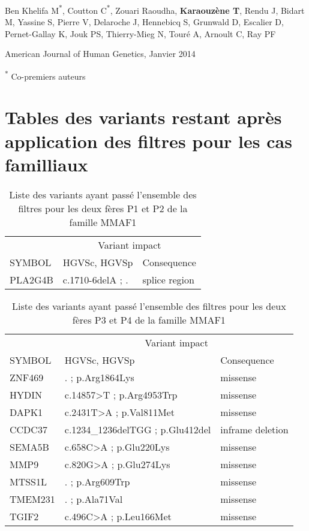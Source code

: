 \documentclass[12pt,twoside]{ugathesis}
\begin{document}
Ben Khelifa M\textsuperscript{*}, Coutton C\textsuperscript{*}, Zouari
Raoudha, \textbf{Karaouzène T}, Rendu J, Bidart M, Yassine S, Pierre V,
Delaroche J, Hennebicq S, Grunwald D, Escalier D, Pernet-Gallay K, Jouk
PS, Thierry-Mieg N, Touré A, Arnoult C, Ray PF

American Journal of Human Genetics, Janvier 2014

\textsuperscript{*} Co-premiers auteurs

\newpage



\newpage

\newpage

\chapter{Tables des variants restant après application des filtres pour
les cas
familliaux}\label{tables-des-variants-restant-apres-application-des-filtres-pour-les-cas-familliaux}

\begin{longtable}[t]{lll}
\caption{\label{tab:tabmmaf1}Liste des variants ayant passé l'ensemble des filtres pour les deux fères P1 et P2 de la famille MMAF1}\\
\toprule
\multicolumn{1}{c}{ } & \multicolumn{2}{c}{Variant impact} \\
\cmidrule(l{2pt}r{2pt}){2-3}
SYMBOL & HGVSc, HGVSp & Consequence\\
\midrule
PLA2G4B & c.1710-6delA ; . & splice region\\
\bottomrule
\end{longtable}

\begin{longtable}[t]{lll}
\caption{\label{tab:tabmmaf2}Liste des variants ayant passé l'ensemble des filtres pour les deux fères P3 et P4 de la famille MMAF1}\\
\toprule
\multicolumn{1}{c}{ } & \multicolumn{2}{c}{Variant impact} \\
\cmidrule(l{2pt}r{2pt}){2-3}
SYMBOL & HGVSc, HGVSp & Consequence\\
\midrule
ZNF469 & . ; p.Arg1864Lys & missense\\
HYDIN & c.14857>T ; p.Arg4953Trp & missense\\
DAPK1 & c.2431T>A ; p.Val811Met & missense\\
CCDC37 & c.1234\_1236delTGG ; p.Glu412del & inframe deletion\\
SEMA5B & c.658C>A ; p.Glu220Lys & missense\\
\addlinespace
MMP9 & c.820G>A ; p.Glu274Lys & missense\\
MTSS1L & . ; p.Arg609Trp & missense\\
TMEM231 & . ; p.Ala71Val & missense\\
TGIF2 & c.496C>A ; p.Leu166Met & missense\\
\bottomrule
\end{longtable}
\end{document}
